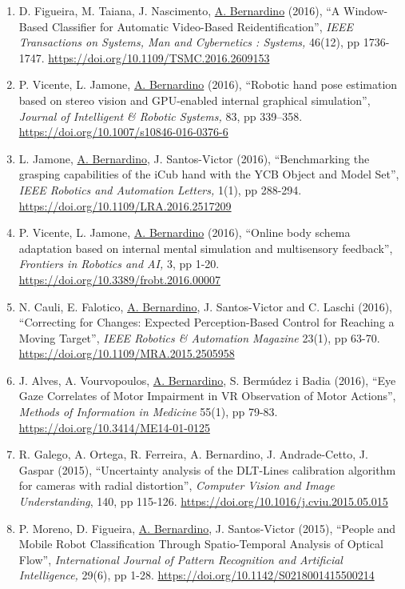 \begin{enumerate}
\item
  D. Figueira, M. Taiana, J. Nascimento, \ul{A. Bernardino} (2016), ``A
  Window-Based Classifier for Automatic Video-Based Reidentification'',
  \emph{IEEE Transactions on Systems, Man and Cybernetics : Systems,}
  46(12), pp 1736-1747.
  \url{https://doi.org/10.1109/TSMC.2016.2609153}~~
\item
  P. Vicente, L. Jamone, \ul{A. Bernardino} (2016), ``Robotic hand pose
  estimation based on stereo vision and GPU-enabled internal graphical
  simulation'', \emph{Journal of Intelligent \& Robotic Systems,} 83, pp
  339--358. \url{https://doi.org/10.1007/s10846-016-0376-6}~
\item
  L. Jamone, \ul{A. Bernardino}, J. Santos-Victor (2016), ``Benchmarking
  the grasping capabilities of the iCub hand with the YCB Object and
  Model Set'', \emph{IEEE Robotics and Automation Letters,} 1(1), pp
  288-294. \url{https://doi.org/10.1109/LRA.2016.2517209}~
\item
  P. Vicente, L. Jamone, \ul{A. Bernardino} (2016), ``Online body schema
  adaptation based on internal mental simulation and multisensory
  feedback'', \emph{Frontiers in Robotics and AI,} 3, pp 1-20.
  \url{https://doi.org/10.3389/frobt.2016.00007}~
\item
  N. Cauli, E. Falotico, \ul{A. Bernardino}, J. Santos-Victor and C.
  Laschi (2016), ``Correcting for Changes: Expected Perception-Based
  Control for Reaching a Moving Target'', \emph{IEEE Robotics \&
  Automation Magazine} 23(1), pp 63-70.
  \url{https://doi.org/10.1109/MRA.2015.2505958}~
\item
  J. Alves, A. Vourvopoulos, \ul{A. Bernardino}, S. Bermúdez i Badia
  (2016), ``Eye Gaze Correlates of Motor Impairment in VR Observation of
  Motor Actions'', \emph{Methods of Information in Medicine} 55(1), pp
  79-83. \url{https://doi.org/10.3414/ME14-01-0125}~
\item
  R. Galego, A. Ortega, R. Ferreira, A. Bernardino, J. Andrade-Cetto, J.
  Gaspar (2015), ``Uncertainty analysis of the DLT-Lines calibration
  algorithm for cameras with radial distortion'', \emph{Computer Vision
  and Image Understanding}, 140, pp 115-126.
  \url{https://doi.org/10.1016/j.cviu.2015.05.015}
\item
  P. Moreno, D. Figueira, \ul{A. Bernardino}, J. Santos-Victor (2015),
  ``People and Mobile Robot Classification Through Spatio-Temporal
  Analysis of Optical Flow'', \emph{International Journal of Pattern
  Recognition and Artificial Intelligence,} 29(6), pp 1-28.
  \url{https://doi.org/10.1142/S0218001415500214}

\end{enumerate}
